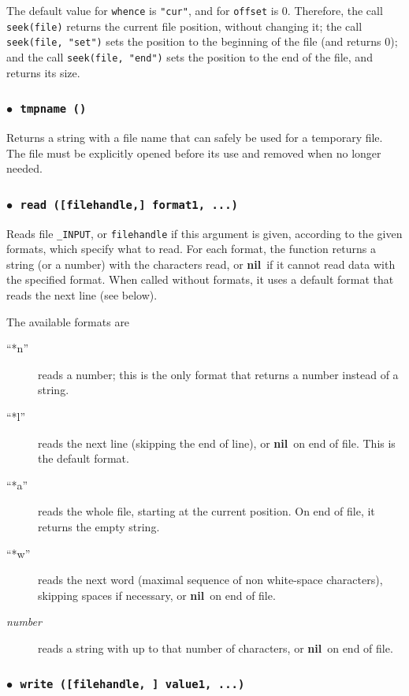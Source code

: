 \documentclass[11pt]{article}
\newcommand{\T}[1]{{\tt #1}}
\newcommand{\nil}{{\bf nil}}
\newcommand{\Deffunc}[1]{\index{#1}}
\newcommand{\ff}{$\bullet$\ }
\begin{document}
The default value for \verb|whence| is \verb|"cur"|,
and for \verb|offset| is 0.
Therefore, the call \verb|seek(file)| returns the current
file position, without changing it;
the call \verb|seek(file, "set")| sets the position to the
beginning of the file (and returns 0);
and the call \verb|seek(file, "end")| sets the position to the
end of the file, and returns its size.

\subsubsection*{\ff \T{tmpname ()}}\Deffunc{tmpname}

Returns a string with a file name that can safely
be used for a temporary file.
The file must be explicitly opened before its use
and removed when no longer needed.

\subsubsection*{\ff \T{read ([filehandle,] format1, ...)}}\Deffunc{read}

Reads file \verb|_INPUT|,
or \verb|filehandle| if this argument is given,
according to the given formats, which specify what to read.
For each format,
the function returns a string (or a number) with the characters read,
or \nil\ if it cannot read data with the specified format.
When called without formats,
it uses a default format that reads the next line
(see below).

The available formats are
\begin{description}
\item[``*n''] reads a number;
this is the only format that returns a number instead of a string.
\item[``*l''] reads the next line
(skipping the end of line), or \nil\ on end of file.
This is the default format.
\item[``*a''] reads the whole file, starting at the current position.
On end of file, it returns the empty string.
\item[``*w''] reads the next word
(maximal sequence of non white-space characters),
skipping spaces if necessary, or \nil\ on end of file.
\item[\emph{number}] reads a string with up to that number of characters,
or \nil\ on end of file.
\end{description}

\subsubsection*{\ff \T{write ([filehandle, ] value1, ...)}}\Deffunc{write}
\end{document}
